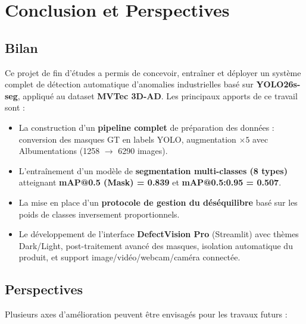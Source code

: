 \documentclass[12pt, a4paper]{report}
\begin{document}
\newpage

\chapter*{Conclusion et Perspectives}

\section*{Bilan}

Ce projet de fin d'études a permis de concevoir, entraîner et déployer un système complet de détection automatique d'anomalies industrielles basé sur \textbf{YOLO26s-seg}, appliqué au dataset \textbf{MVTec 3D-AD}. Les principaux apports de ce travail sont :

\begin{itemize}
  \item La construction d'un \textbf{pipeline complet} de préparation des données : conversion des masques GT en labels YOLO, augmentation $\times5$ avec Albumentations (1258 $\to$ 6290 images).
  \item L'entraînement d'un modèle de \textbf{segmentation multi-classes (8 types)} atteignant \textbf{mAP@0.5 (Mask) = 0.839} et \textbf{mAP@0.5:0.95 = 0.507}.
  \item La mise en place d'un \textbf{protocole de gestion du déséquilibre} basé sur les poids de classes inversement proportionnels.
  \item Le développement de l'interface \textbf{DefectVision Pro} (Streamlit) avec thèmes Dark/Light, post-traitement avancé des masques, isolation automatique du produit, et support image/vidéo/webcam/caméra connectée.
\end{itemize}

\section*{Perspectives}

Plusieurs axes d'amélioration peuvent être envisagés pour les travaux futurs :
\end{document}

